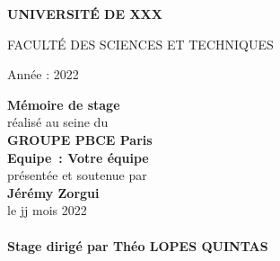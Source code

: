\sloppy
\thispagestyle{empty}
\vspace{-3cm}
\begin{center}
   \begin{Large}
     \textbf{UNIVERSITÉ DE XXX}\\ [2mm]
   \end{Large}
   \begin{large}
     FACULTÉ DES SCIENCES ET TECHNIQUES \\ [7mm]
   \end{large}
\end{center}
Année : 2022 \hspace{10cm} %
\begin{center}
   \LARGE \textbf{Mémoire de stage} \\ [2mm]
   \normalsize réalisé au seine du \\[5mm]
   \large \textbf{GROUPE PBCE Paris} \\ [5mm]
   \normalsize \textbf{Equipe~: Votre équipe} \\ [7mm]
  \normalsize présentée et soutenue par \\ [3mm]
   \large \textbf{Jérémy Zorgui} \\ [5mm]
   \normalsize le jj mois 2022  \\ [7mm]
   \hspace{-5mm}
   \\ [10mm]%
   \normalsize \textbf{Stage dirigé par Théo LOPES QUINTAS} \\[5mm]
\end{center}
